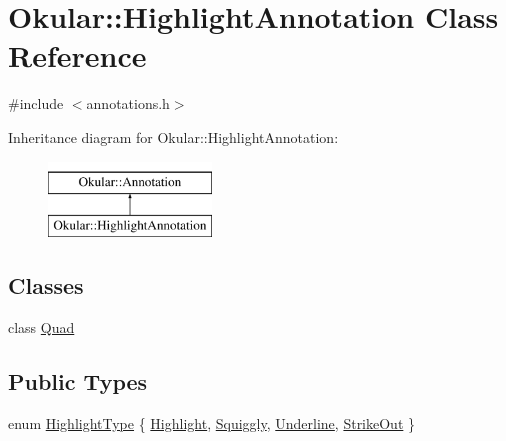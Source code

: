 \hypertarget{classOkular_1_1HighlightAnnotation}{\section{Okular\+:\+:Highlight\+Annotation Class Reference}
\label{classOkular_1_1HighlightAnnotation}
}


{\ttfamily \#include $<$annotations.\+h$>$}

Inheritance diagram for Okular\+:\+:Highlight\+Annotation\+:\begin{figure}[H]
\begin{center}
\leavevmode
\includegraphics[height=2.000000cm]{classOkular_1_1HighlightAnnotation}
\end{center}
\end{figure}
\subsection*{Classes}
\begin{DoxyCompactItemize}
\item 
class \hyperlink{classOkular_1_1HighlightAnnotation_1_1Quad}{Quad}
\end{DoxyCompactItemize}
\subsection*{Public Types}
\begin{DoxyCompactItemize}
\item 
enum \hyperlink{classOkular_1_1HighlightAnnotation_a63d2488735d1d6320e2e118743243999}{Highlight\+Type} \{ \hyperlink{classOkular_1_1HighlightAnnotation_a63d2488735d1d6320e2e118743243999a250833fcd89a56dd46955dc287e1a3af}{Highlight}, 
\hyperlink{classOkular_1_1HighlightAnnotation_a63d2488735d1d6320e2e118743243999ad02aabccfaaea6082d9402b01e6ae9b8}{Squiggly}, 
\hyperlink{classOkular_1_1HighlightAnnotation_a63d2488735d1d6320e2e118743243999a1cb762e7ebfd92add9d8b71106e3fa2c}{Underline}, 
\hyperlink{classOkular_1_1HighlightAnnotation_a63d2488735d1d6320e2e118743243999afcdb9513e4039b7239d89f351f8aff85}{Strike\+Out}
 \}
\end{DoxyCompactItemize}
